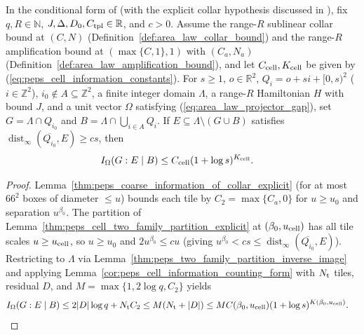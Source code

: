 \begin{lemma}
    \label{thm:peps_cell_conditional_information_of_collar_explicit}
    \leanok
    In the conditional form of \cite[Lemma~3.2]{OpenAI2026PolynomialPEPS}
    (with the explicit collar hypothesis discussed in
    \cite{gap:polypeps_angular_annular_geometry_scope}), fix
    $q,R\in\mathbb N$, $J,\Delta,D_0,C_{\rm tpl}\in\mathbb R$, and $c>0$.
    Assume the range-$R$ sublinear collar bound at $(C,N)$ (Definition~\ref{def:area_law_collar_bound})
    and the range-$R$ amplification bound at $(\max\{C,1\},1)$ with $(C_a,N_a)$ (Definition~\ref{def:area_law_amplification_bound}),
    and let $C_{\rm cell},K_{\rm cell}$ be given by (\ref{eq:peps_cell_information_constants}).
    For $s\ge1$, $o\in\mathbb R^2$, $Q_i=o+si+[0,s)^2$ ($i\in\mathbb Z^2$),
    $i_0\notin A\subseteq\mathbb Z^2$, a finite integer domain $\Lambda$, a range-$R$ Hamiltonian $H$ with bound $J$, and a unit vector $\Omega$ satisfying (\ref{eq:area_law_projector_gap}),
    set $G=\Lambda\cap Q_{i_0}$ and $B=\Lambda\cap\bigcup_{i\in A}Q_i$.
    If $E\subseteq\Lambda\setminus(G\cup B)$ satisfies $\operatorname{dist}_\infty(\overline{Q_{i_0}},E)\ge cs$, then
    \begin{align}
        I_\Omega(G:E\mid B) & \le C_{\rm cell}(1+\log s)^{K_{\rm cell}}.
        \label{eq:peps_cell_cmi_explicit}
    \end{align}
\end{lemma}
\begin{proof}\leanok
    Lemma~\ref{thm:peps_coarse_information_of_collar_explicit} (for at most $66^2$ boxes of diameter $\le u$) bounds each tile by $C_2=\max\{C_a,0\}$ for $u\ge u_0$ and separation $u^{\beta_0}$. The partition of Lemma~\ref{thm:peps_cell_two_family_partition_explicit} at $(\beta_0,u_{\rm cell})$ has all tile scales $u\ge u_{\rm cell}$, so $u\ge u_0$ and $2u^{\beta_0}\le cu$ (giving $u^{\beta_0}<cs\le\operatorname{dist}_\infty(\overline{Q_{i_0}},E)$). Restricting to $\Lambda$ via Lemma~\ref{thm:peps_two_family_partition_inverse_image} and applying Lemma~\ref{cor:peps_cell_information_counting_form} with $N_{\rm t}$ tiles, residual $D$, and $M=\max\{1,2\log q,C_2\}$ yields
    \begin{align}
        I_\Omega(G:E\mid B)
         & \le 2|D|\log q+N_{\rm t}C_2
        \le M(N_{\rm t}+|D|)
        \le MC(\beta_0,u_{\rm cell})(1+\log s)^{K(\beta_0,u_{\rm cell})}.
        \notag
    \end{align}
\end{proof}

